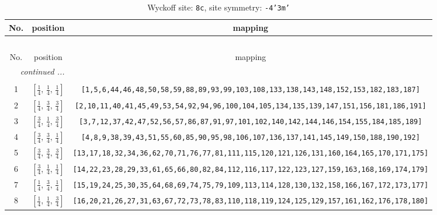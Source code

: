 \documentclass[fleqn,8pt]{jsarticle}
\begin{document}
\begin{longtable}{ccc}
\caption{Wyckoff site: {\tt 8c}, site symmetry: {\tt -4'3m'}}
 \\
 \hline \hline
No. & position & mapping \\ \hline \endfirsthead

\multicolumn{2}{l}{\tablename\ \thetable{}} \\
 \hline \hline
No. & position & mapping \\ \hline \endhead

 \hline \hline
\multicolumn{2}{r}{\footnotesize\it continued ...} \\ \endfoot

 \hline \hline
\multicolumn{2}{r}{} \\ \endlastfoot

1 & $\left[ \frac{1}{4},\, \frac{1}{4},\, \frac{1}{4} \right]$ & {\tt [1,5,6,44,46,48,50,58,59,88,89,93,99,103,108,133,138,143,148,152,153,182,183,187]} \\ \hline
2 & $\left[ \frac{1}{4},\, \frac{3}{4},\, \frac{3}{4} \right]$ & {\tt [2,10,11,40,41,45,49,53,54,92,94,96,100,104,105,134,135,139,147,151,156,181,186,191]} \\ \hline
3 & $\left[ \frac{3}{4},\, \frac{1}{4},\, \frac{3}{4} \right]$ & {\tt [3,7,12,37,42,47,52,56,57,86,87,91,97,101,102,140,142,144,146,154,155,184,185,189]} \\ \hline
4 & $\left[ \frac{3}{4},\, \frac{3}{4},\, \frac{1}{4} \right]$ & {\tt [4,8,9,38,39,43,51,55,60,85,90,95,98,106,107,136,137,141,145,149,150,188,190,192]} \\ \hline
5 & $\left[ \frac{3}{4},\, \frac{3}{4},\, \frac{3}{4} \right]$ & {\tt [13,17,18,32,34,36,62,70,71,76,77,81,111,115,120,121,126,131,160,164,165,170,171,175]} \\ \hline
6 & $\left[ \frac{3}{4},\, \frac{1}{4},\, \frac{1}{4} \right]$ & {\tt [14,22,23,28,29,33,61,65,66,80,82,84,112,116,117,122,123,127,159,163,168,169,174,179]} \\ \hline
7 & $\left[ \frac{1}{4},\, \frac{3}{4},\, \frac{1}{4} \right]$ & {\tt [15,19,24,25,30,35,64,68,69,74,75,79,109,113,114,128,130,132,158,166,167,172,173,177]} \\ \hline
8 & $\left[ \frac{1}{4},\, \frac{1}{4},\, \frac{3}{4} \right]$ & {\tt [16,20,21,26,27,31,63,67,72,73,78,83,110,118,119,124,125,129,157,161,162,176,178,180]} \\
\end{longtable}
\renewcommand{\arraystretch}{1.2}
\end{document}
